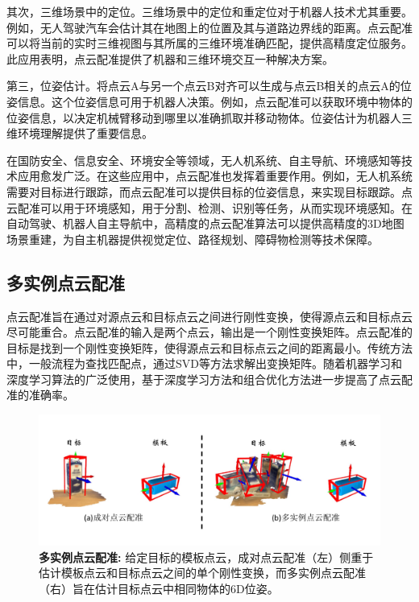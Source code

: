 其次，三维场景中的定位。三维场景中的定位和重定位对于机器人技术尤其重要。例如，无人驾驶汽车会估计其在地图上的位置及其与道路边界线的距离。点云配准可以将当前的实时三维视图与其所属的三维环境准确匹配，提供高精度定位服务。此应用表明，点云配准提供了机器和三维环境交互一种解决方案。

第三，位姿估计。将点云A与另一个点云B对齐可以生成与点云B相关的点云A的位姿信息。这个位姿信息可用于机器人决策。例如，点云配准可以获取环境中物体的位姿信息，以决定机械臂移动到哪里以准确抓取并移动物体。位姿估计为机器人三维环境理解提供了重要信息。

在国防安全、信息安全、环境安全等领域，无人机系统、自主导航、环境感知等技术应用愈发广泛。在这些应用中，点云配准也发挥着重要作用。例如，无人机系统需要对目标进行跟踪，而点云配准可以提供目标的位姿信息，来实现目标跟踪。点云配准可以用于环境感知，用于分割、检测、识别等任务，从而实现环境感知。在自动驾驶、机器人自主导航中，高精度的点云配准算法可以提供高精度的3D地图场景重建，为自主机器提供视觉定位、路径规划、障碍物检测等技术保障\cite{zidongjiashilujingguihua}。


\subsection{多实例点云配准}
点云配准旨在通过对源点云和目标点云之间进行刚性变换，使得源点云和目标点云尽可能重合。点云配准的输入是两个点云，输出是一个刚性变换矩阵。点云配准的目标是找到一个刚性变换矩阵，使得源点云和目标点云之间的距离最小。传统方法中，一般流程为查找匹配点，通过SVD等方法求解出变换矩阵。随着机器学习和深度学习算法的广泛使用，基于深度学习方法和组合优化方法进一步提高了点云配准的准确率\cite{deng2018ppf,deng2018ppfnet,qin2022geometric}。

\begin{figure}[ht]
    \vspace{-4mm}
    \includegraphics[width=\textwidth]{images/teaser.pdf}
    \caption{\textbf{多实例点云配准: } 给定目标的模板点云，成对点云配准（左）侧重于估计模板点云和目标点云之间的单个刚性变换，而多实例点云配准（右）旨在估计目标点云中相同物体的6D位姿。
    }
    \label{fig:teaser}
    \vspace{-10mm}
\end{figure}

